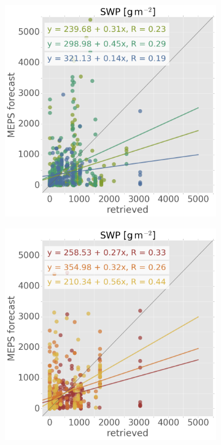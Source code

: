 \begin{figure}[ht!]
	\centering
	\begin{subfigure}[b]{0.49\textwidth}
		\includegraphics[width=\textwidth]{./fig_SWP_scat/EM09_20161221_23_00}
		\caption{}\label{fig:SWP:2123}
	\end{subfigure}
	\begin{subfigure}[b]{0.49\textwidth}
		\includegraphics[width=\textwidth]{./fig_SWP_scat/EM09_20161224_26_00}

\end{subfigure}
\end{figure}
